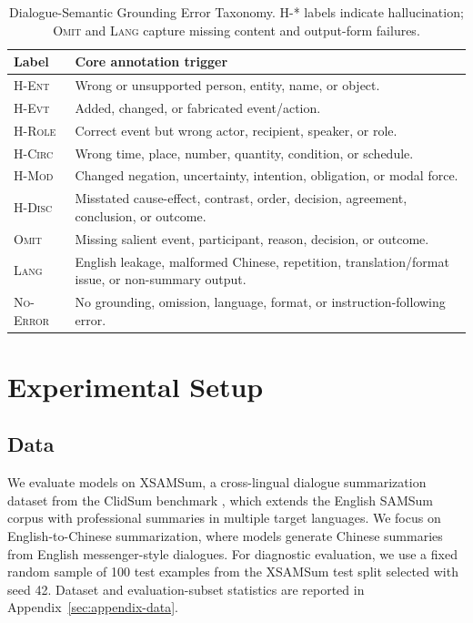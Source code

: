 \documentclass[11pt]{article}
\begin{document}
\begin{table}[H]
\centering
\scriptsize
\setlength{\tabcolsep}{2pt}
\renewcommand{\arraystretch}{0.92}
\begin{tabularx}{\columnwidth}{@{}lX@{}}
\toprule
Label & Core annotation trigger \\
\midrule
\textsc{H-Ent} & Wrong or unsupported person, entity, name, or object. \\
\textsc{H-Evt} & Added, changed, or fabricated event/action. \\
\textsc{H-Role} & Correct event but wrong actor, recipient, speaker, or role. \\
\textsc{H-Circ} & Wrong time, place, number, quantity, condition, or schedule. \\
\textsc{H-Mod} & Changed negation, uncertainty, intention, obligation, or modal force. \\
\textsc{H-Disc} & Misstated cause-effect, contrast, order, decision, agreement, conclusion, or outcome. \\
\textsc{Omit} & Missing salient event, participant, reason, decision, or outcome. \\
\textsc{Lang} & English leakage, malformed Chinese, repetition, translation/format issue, or non-summary output. \\
\textsc{No-Error} & No grounding, omission, language, format, or instruction-following error. \\
\bottomrule
\end{tabularx}
\caption{Dialogue-Semantic Grounding Error Taxonomy. \textsc{H-*} labels indicate hallucination; \textsc{Omit} and \textsc{Lang} capture missing content and output-form failures.}
\label{tab:taxonomy}
\end{table}

\section{Experimental Setup}
\subsection{Data}

We evaluate models on XSAMSum, a cross-lingual dialogue summarization dataset from the ClidSum benchmark \citep{wang-etal-2022-clidsum}, which extends the English SAMSum corpus \citep{gliwa-etal-2019-samsum} with professional summaries in multiple target languages. We focus on English-to-Chinese summarization, where models generate Chinese summaries from English messenger-style dialogues. For diagnostic evaluation, we use a fixed random sample of 100 test examples from the XSAMSum test split selected with seed 42. Dataset and evaluation-subset statistics are reported in Appendix~\ref{sec:appendix-data}.
\end{document}
